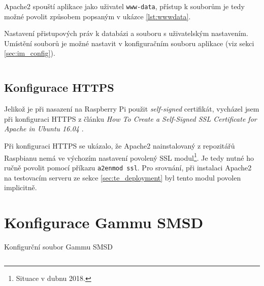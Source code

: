 Apache2 spouští aplikace jako uživatel \texttt{www-data}, přístup k souborům je tedy možné povolit způsobem popsaným v ukázce \ref{lst:wwwdata}.

\begin{listing}[htbp]
\caption{\label{lst:wwwdata} Nastavení přistupových práv k databázi a souboru s uživatelským nastavením. Umístění souborů je možné nastavit v konfiguračním souboru aplikace (viz sekci \ref{sec:im_config}).}
\inputminted[bgcolor=codebg]{bash}{source-samples/wwwdata.sh}
\end{listing}

\subsection{Konfigurace HTTPS}

Jelikož je při nasazení na Raspberry Pi použit \textit{self-signed} certifikát, vycházel jsem při konfiguraci HTTPS z článku \textit{How To Create a Self-Signed SSL Certificate for Apache in Ubuntu 16.04} \cite{digital_ocean_selfsigned}.

Při konfiguraci HTTPS se ukázalo, že Apache2 nainstalovaný z repozitářů Raspbianu nemá ve výchozím nastavení povolený SSL modul\footnote{Situace v dubnu 2018.}. Je tedy nutné ho ručně povolit pomocí příkazu \texttt{a2enmod ssl}. Pro srovnání, při instalaci Apache2 na testovacím serveru ze sekce \ref{sec:te_deployment} byl tento modul povolen implicitně.

\section{Konfigurace Gammu SMSD}

\begin{listing}[htbp]
\caption{\label{lst:gammurc} Konfigurční soubor Gammu SMSD}
\inputminted[bgcolor=codebg]{ini}{source-samples/gammurc}
\end{listing}

